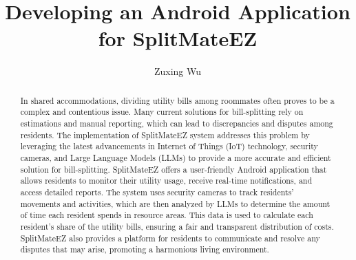 \documentclass[sigconf,nonacm]{acmart}\settopmatter{printfolios=true}
\begin{document}
\title{Developing an Android Application for SplitMateEZ}

\author{Zuxing Wu}

\renewcommand{\shortauthors}{Z. Wu}

\begin{abstract}
In shared accommodations, dividing utility bills among roommates often proves to be a complex and contentious issue. Many current solutions for bill-splitting rely on estimations and manual reporting, which can lead to discrepancies and disputes among residents. The implementation of SplitMateEZ system addresses this problem by leveraging the latest advancements in Internet of Things (IoT) technology, security cameras, and Large Language Models (LLMs) to provide a more accurate and efficient solution for bill-splitting. SplitMateEZ offers a user-friendly Android application that allows residents to monitor their utility usage, receive real-time notifications, and access detailed reports. The system uses security cameras to track residents' movements and activities, which are then analyzed by LLMs to determine the amount of time each resident spends in resource areas. This data is used to calculate each resident's share of the utility bills, ensuring a fair and transparent distribution of costs. SplitMateEZ also provides a platform for residents to communicate and resolve any disputes that may arise, promoting a harmonious living environment.
\end{abstract}
\end{document}
